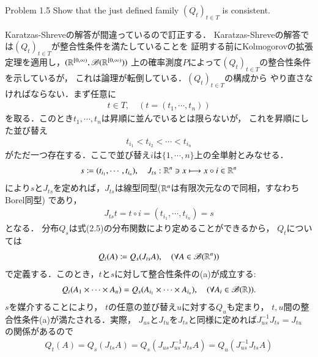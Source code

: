 	\begin{itembox}[l]{Problem 1.5}
			Show that the just defined family $(Q_{t})_{t \in T}$ is consistent.
	\end{itembox}
	
	\begin{prf}
		Karatzas-Shreveの解答が間違っているので訂正する．
		Karatzas-Shreveの解答では$(Q_{t})_{t \in T}$が整合性条件を満たしていることを
		証明する前にKolmogorovの拡張定理を適用し，$(\mathbb{R}^{[0,\infty)},\mathscr{B}(\mathbb{R}^{[0,\infty)}))$
		上の確率測度$P$によって$(Q_{t})_{t \in T}$の整合性条件を示しているが，
		これは論理が転倒している．$(Q_{t})_{t \in T}$の構成から
		やり直さなければならない．まず任意に
		\begin{align}
			t \in T,
			\quad (t = (t_1,\cdots,t_n)) 
		\end{align}
		を取る．このとき$t_1,\cdots,t_n$は昇順に並んでいるとは限らないが，
		これを昇順にした並び替え
		\begin{align}
			t_{i_1} < t_{i_2} < \cdots < t_{i_n}
		\end{align}
		がただ一つ存在する．ここで並び替え$i$は$\{1,\cdots,n\}$上の全単射とみなせる．
		\begin{align}
			s \coloneqq (t_{i_1},\cdots,t_{i_n}),
			\quad J_{ts} : \mathbb{R}^n \ni x \longmapsto x \circ i \in \mathbb{R}^n
		\end{align}
		により$s$と$J_{ts}$を定めれば，$J_{ts}$は線型同型($\mathbb{R}^n$は有限次元なので同相，すなわちBorel同型)
		であり，
		\begin{align}
			J_{ts} t = t \circ i = (t_{i_1},\cdots,t_{i_n}) = s
		\end{align}
		となる．
		分布$Q_{s}$は式(2.5)の分布関数により定めることができるから，
		$Q_{t}$については
		\begin{align}
			Q_{t}(A) \coloneqq Q_{s}(J_{ts}A),
			\quad (\forall A \in \mathscr{B}(\mathbb{R}^n))
		\end{align}
		で定義する．このとき，$t$と$s$に対して整合性条件の(a)が成立する:
		\begin{align}
			Q_{t} (A_1 \times \cdots \times A_n)
			= Q_{s}(A_{i_1} \times \cdots \times A_{i_n}),
			\quad (\forall A_i \in \mathscr{B}(\mathbb{R})).
		\end{align}
		$s$を媒介することにより，
		$t$の任意の並び替え$u$に対する$Q_{u}$も定まり，
		$t,u$間の整合性条件(a)が満たされる．実際，
		$J_{us}$と$J_{tu}$を$J_{ts}$と同様に定めれば$J_{us}^{-1}J_{ts} = J_{tu}$
		の関係があるので
		\begin{align}
			Q_{t}(A) = Q_{s}(J_{ts}A)
			= Q_{s}(J_{us}J_{us}^{-1}J_{ts}A)
			= Q_{u}(J_{us}^{-1}J_{ts}A)

\end{align}
\end{prf}
